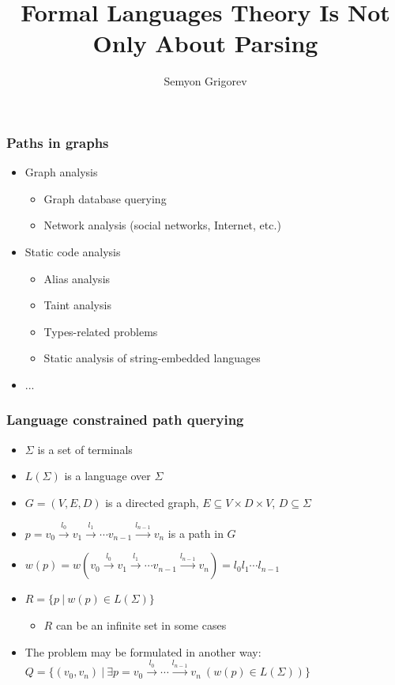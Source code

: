 \documentclass[xcolor=table,aspectratio=169]{beamer}
\title[CFPQ]{Formal Languages Theory Is Not Only About Parsing}
\institute[JetBrains Research]{
JetBrains Research, Programming Languages and Tools Lab
}
\author[Semyon Grigorev]{Semyon Grigorev}
\date{}
\begin{document}
{
\begin{frame}[plain]
  \titlepage
\end{frame}
}

\begin{frame}[fragile]
  \transwipe[direction=90]
  \frametitle{Paths in graphs}
  \begin{itemize}
  \item Graph analysis
    \begin{itemize}
        \item Graph database querying
        \item Network analysis (social networks, Internet, etc.)
    \end{itemize}
  \item Static code analysis
      \begin{itemize}
        \item Alias analysis
        \item Taint analysis
        \item Types-related problems
        \item Static analysis of string-embedded languages
      \end{itemize}
   \item ...
  \end{itemize}
\end{frame}

\begin{frame}[fragile]
  \transwipe[direction=90]
  \frametitle{Language constrained path querying}
  \begin{itemize}
  \item $\Sigma$ is a set of terminals 
  \item $L(\Sigma)$ is a language over $\Sigma$
  \pause
  \item $G = (V,E,D)$ is a directed graph, $E \subseteq V\times D \times V$, $D\subseteq \Sigma$
  \pause
  \item $p = v_0 \xrightarrow{l_0} v_1 \xrightarrow{l_1} \cdots v_{n-1}\xrightarrow{l_{n-1}}v_n$ is a path in $G$
  \item $w(p) = w(v_0 \xrightarrow{l_0} v_1 \xrightarrow{l_1} \cdots v_{n-1}\xrightarrow{l_{n-1}}v_n) = l_0 l_1 \cdots l_{n-1}$
  \pause
  \item $R =\{ p \ | \ w(p) \in L(\Sigma)\}$
  \begin{itemize}
    \item $R$ can be an infinite set in some cases
  \end{itemize}
  \pause
  \item The problem may be formulated in another way: $Q =\{ (v_0,v_n) \ | \ \exists p = v_0 \xrightarrow{l_0} \cdots \xrightarrow{l_{n-1}}v_n \ (w(p) \in 
  L(\Sigma))\}$
  \end{itemize}
\end{frame}
\end{document}
